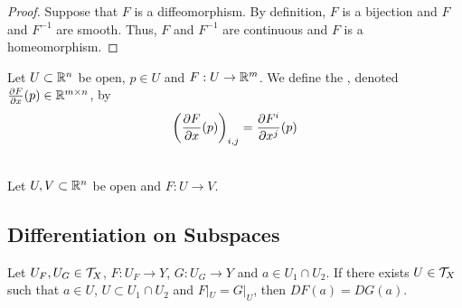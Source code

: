 \documentclass{book}
\begin{document}
	\begin{proof}
	Suppose that $F$ is a diffeomorphism. By definition, $F$ is a bijection and $F$ and $F^{-1}$ are smooth. Thus, $F$ and $F^{-1}$ are continuous and $F$ is a homeomorphism.
	\end{proof}
	
	\begin{defn} 
	Let $U \subset \mathbb{R}^n$ be open, $p \in U$ and $F: U \rightarrow \mathbb{R}^m$. We define the , denoted $\frac{\partial F}{\partial x}(p) \in \mathbb{R}^{m \times n}$, by $$\bigg (\frac{\partial F}{\partial x}(p) \bigg )_{i,j} = \frac{\partial F^i}{\partial x^j}(p)$$
	\end{defn}
	
	\begin{ex}  \\
	Let $U,V \subset \mathbb{R}^n$ be open and $F: U \rightarrow V$.
	\end{ex}
	
	
	
	
	
	
	
	
	
	
	
	
	
	
	
	
	
	
	
	
	
	
	
	
	
	
	
	
	
	
	
	
	
	
	
	
	
	
	
	
	
	\newpage
	\subsection{Differentiation on Subspaces}
	
	\begin{ex} 
		Let $U_F, U_G \in \mathcal{T}_X$, $F: U_F \rightarrow Y$, $G: U_G \rightarrow Y$ and $a \in U_1 \cap U_2$. If there exists $U \in \mathcal{T}_X$ such that $a \in U$, $U \subset U_1 \cap U_2$ and $F|_U = G|_U$, then $DF(a) = DG(a)$. 
	\end{ex}
	
\end{document}
